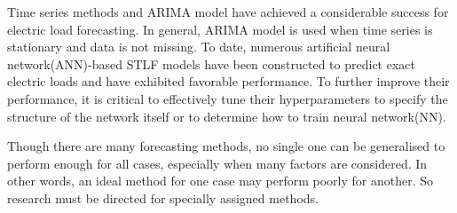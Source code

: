 \documentclass{article}
\begin{document}
{                Time series methods and ARIMA model have achieved a considerable success for electric load forecasting. In general, ARIMA model is used when time series is stationary and data is not missing. To date, numerous artificial neural network(ANN)-based STLF models have been constructed to predict exact electric loads and have exhibited favorable performance. To further improve their performance, it is critical to effectively tune their hyperparameters to specify the structure of the network itself or to determine how to train neural network(NN).
                
                Though there are many forecasting methods, no single one can be generalised to perform enough for all cases, especially when many factors are considered. In other words, an ideal method for one case may perform poorly for another. So research must be directed for specially assigned methods.
                
}  
\newpage
\large{}
 
 
\newpage
\end{document}
